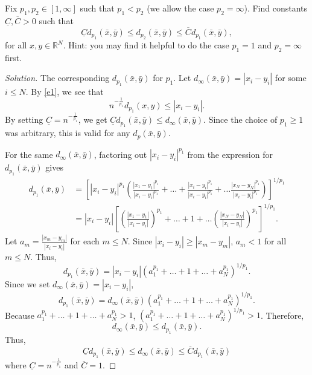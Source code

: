 \documentclass[11pt,letterpaper]{article}
\newcommand{\R}{\mathbb{R}}
\newenvironment{prob}[1]
  {\renewcommand\theinnerprob{#1}\innerprob}
  {\endinnerprob}
\newenvironment{solution}
  {\renewcommand\qedsymbol{}\begin{proof}[Solution]}
  {\end{proof}\bigskip}
\begin{document}
\begin{prob}{2}  %
Fix $p_1,p_2 \in [1,\infty]$ such that $p_1 < p_2$ (we allow the case $p_2 = \infty$).  Find constants $\underline C, \overline C >0$ such that
\[
	\underline C d_{p_1}(\bar x, \bar y)
		\leq d_{p_2}(\bar x, \bar y)
		\leq \overline C d_{p_1}(\bar x, \bar y),
\]
for all $x,y \in \R^N$.  Hint: you may find it helpful to do the case $p_1 = 1$ and $p_2=\infty$ first.
\end{prob}
\begin{solution}
	The corresponding $d_{p_1}(\bar x, \bar y)$ for $p_1$. Let $d_\infty(\bar x, \bar y) = |x_i-y_i|$ for some $i\leq N$. By \eqref{e1}, we see that $$n^{-\frac{1}{p_1}}d_{p_1}(x,y) \leq |x_i-y_i|.$$ By setting $\underline C = n^{-\frac{1}{p_1}}$, we get $\underline C d_{p_1}(\bar x,\bar y) \leq d_\infty(\bar x, \bar y)$. Since the choice of $p_1\geq 1$ was arbitrary, this is valid for any $d_p(\bar x, \bar y)$.
	
	For the same $d_\infty(\bar x, \bar y)$, factoring out $|x_i-y_i|^{p_1}$ from the expression for $d_{p_1}(\bar x, \bar y)$ gives 
	\[\begin{split}
	d_{p_1}(\bar x, \bar y) &= \left [ |x_i-y_i|^{p_1} \left ( \frac{|x_1-y_1|^{p_1}}{|x_i-y_i|^{p_1}} + \dotsc + \frac{|x_i-y_i|^{p_1}}{|x_i-y_i|^{p_1}} + \dotsc \frac{|x_N-y_N|^{p_1}}{|x_i-y_i|^{p_1}} \right ) \right ] ^{1/{p_1}} \\
	&=|x_i-y_i| \left [ \left ( \frac{|x_1-y_1|}{|x_i-y_i|} \right )^{p_1} + \dotsc + 1 + \dotsc \left ( \frac{|x_N-y_N|}{|x_i-y_i|} \right )^{p_1} \right ] ^{1/{p_1}}.
	\end{split}
	\]
	Let $a_m = \frac{|x_m-y_m|}{|x_i-y_i|}$ for each $m\leq N$. Since $|x_i-y_i| \geq |x_m-y_m|$, $a_m<1$ for all $m \leq N$. Thus, 
	\begin{equation}\label{e2}
		d_{p_1}(\bar x, \bar y) = |x_i-y_i| (a_1^{p_1} + \dotsc + 1 + \dotsc + a_N^{p_1})^{1/p_1}.
	\end{equation}
	Since we set $d_\infty(\bar x, \bar y) = |x_i-y_i|$, $$d_{p_1}(\bar x, \bar y) = d_\infty(\bar x, \bar y) (a_1^{p_1} + \dotsc + 1 + \dotsc + a_N^{p_1})^{1/p_1}.$$ Because $a_1^{p_1} + \dotsc + 1 + \dotsc + a_N^{p_1} > 1$, $(a_1^{p_1} + \dotsc + 1 + \dotsc + a_N^{p_1})^{1/p_1} > 1$. Therefore, $$d_\infty(\bar x, \bar y)\leq d_{p_1}(\bar x, \bar y).$$ Thus, 
	\begin{equation}\label{e3} 
		\underline C d_{p_1}(\bar x, \bar y) \leq d_\infty(\bar x, \bar y)\leq \overline C d_{p_1}(\bar x, \bar y) 
	\end{equation}	
	where $\underline C = n^{-\frac{1}{p_1}}$ and $\overline C = 1$.
	

\end{solution}
\end{document}
